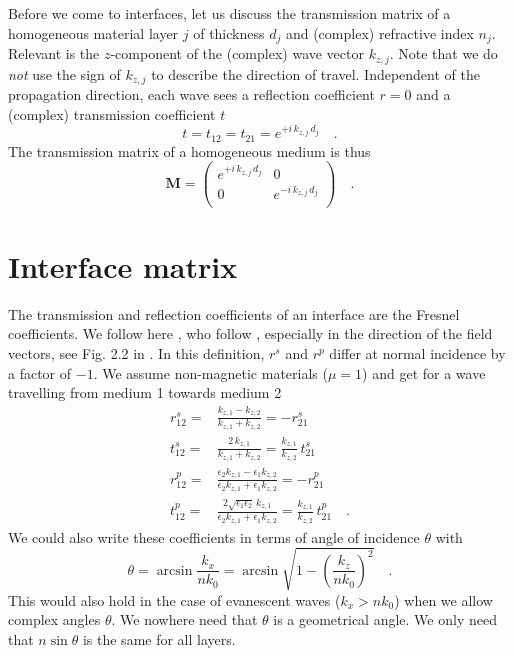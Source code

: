 Before we come to interfaces, let us discuss the transmission matrix of a homogeneous material layer $j$ of thickness $d_j$ and (complex) refractive index $n_j$. Relevant is the $z$-component of the (complex) wave vector $k_{z,j}$. Note that we do \emph{not} use the sign of  $k_{z,j}$ to describe the direction of travel.
Independent of the propagation direction, each wave sees a reflection coefficient $r=0$ and a (complex) transmission coefficient $t$
\begin{equation}
t = t_{12} = t_{21} = e^{+ i \, k_{z,j} \, d_j } \quad . 
\end{equation}
The transmission matrix of a homogeneous medium is thus
\begin{equation}
\mathbf{M} = 
\begin{pmatrix}
e^{+i \, k_{z,j} \, d_j } & 0 \\0 & e^{-i \, k_{z,j} \, d_j } \\
\end{pmatrix} \quad . 
\label{eq:surface_M_prob}
\end{equation}


\section{Interface matrix}

The transmission and reflection coefficients of an interface are the Fresnel coefficients. We follow here \cite{Novotny-Hecht2012}, who follow \cite{BornWolf2002}, especially in the direction of the field vectors, see Fig. 2.2 in \cite{Novotny-Hecht2012}. In this definition,  $r^s$ and $r^p$ differ at normal incidence by a factor of $-1$. We assume non-magnetic materials ($\mu = 1$) and get for a wave travelling from medium 1 towards medium 2
\begin{align}
 r_{12}^s = & \frac{k_{z,1} - k_{z,2}}{k_{z,1} + k_{z,2}}  = - r_{21}^s\\
 t_{12}^s = & \frac{2 \, k_{z,1}}{k_{z,1} + k_{z,2}} =  \frac{k_{z,1}}{k_{z,2}}  \,  t_{21}^s\\
  r_{12}^p = & \frac{\epsilon_2	 k_{z,1} - \epsilon_1 k_{z,2}}
				  {\epsilon_2 k_{z,1} + \epsilon_1 k_{z,2}}  = - r_{21}^p\\
  t_{12}^p = & \frac{2 \sqrt{\epsilon_1 \epsilon_2}	 \,k_{z,1} }
				  {\epsilon_2 k_{z,1} + \epsilon_1 k_{z,2}}  = \frac{k_{z,1}}{k_{z,2}}  \,  t_{21}^p \quad . 
\end{align}
We could also write these coefficients in terms of angle of incidence $\theta$ with
\begin{equation}
 \theta = \arcsin \frac{k_x}{n k_0} = \arcsin \sqrt{1 - \left( \frac{k_z}{n k_0} \right)^2 } \quad . 
\end{equation}
This would also hold in the case of evanescent waves ($k_x > n k_0$) when we allow complex angles $\theta$. We nowhere need that $\theta$ is a geometrical angle. We only need that $n \sin \theta$ is the same for all layers.


